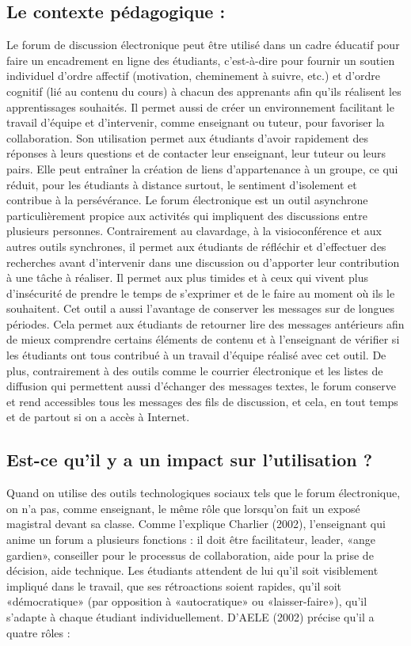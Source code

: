 \documentclass[12pt,a4paper,titlepage]{article}
\begin{document}
\subsection{Le contexte pédagogique :}
Le forum de discussion électronique peut être utilisé dans un cadre éducatif pour faire
un encadrement en ligne des étudiants, c'est-à-dire pour fournir un soutien individuel d'ordre
affectif (motivation, cheminement à suivre, etc.) et d'ordre cognitif (lié au contenu du cours) à
chacun des apprenants afin qu'ils réalisent les apprentissages souhaités. Il permet aussi de créer
un environnement facilitant le travail d'équipe et d'intervenir, comme enseignant ou tuteur, pour
favoriser la collaboration. Son utilisation permet aux étudiants d'avoir rapidement des réponses
à leurs questions et de contacter leur enseignant, leur tuteur ou leurs pairs. Elle peut entraîner
la création de liens d'appartenance à un groupe, ce qui réduit, pour les étudiants à distance
surtout, le sentiment d'isolement et contribue à la persévérance.\newline
Le forum électronique est un outil asynchrone particulièrement propice aux activités qui
impliquent des discussions entre plusieurs personnes. Contrairement au clavardage, à la
visioconférence et aux autres outils synchrones, il permet aux étudiants de réfléchir et
d’effectuer des recherches avant d'intervenir dans une discussion ou d'apporter leur contribution
à une tâche à réaliser. Il permet aux plus timides et à ceux qui vivent plus d'insécurité de prendre
le temps de s'exprimer et de le faire au moment où ils le souhaitent. Cet outil a aussi l'avantage
de conserver les messages sur de longues périodes. Cela permet aux étudiants de retourner lire
des messages antérieurs afin de mieux comprendre certains éléments de contenu et à
l'enseignant de vérifier si les étudiants ont tous contribué à un travail d'équipe réalisé avec cet
outil. De plus, contrairement à des outils comme le courrier électronique et les listes de diffusion
qui permettent aussi d'échanger des messages textes, le forum conserve et rend accessibles tous
les messages des fils de discussion, et cela, en tout temps et de partout si on a accès à Internet.\newline
\subsection{Est-ce qu’il y a un impact sur l’utilisation ?}
Quand on utilise des outils technologiques sociaux tels que le forum électronique, on
n'a pas, comme enseignant, le même rôle que lorsqu'on fait un exposé magistral devant sa
classe. Comme l'explique Charlier (2002), l'enseignant qui anime un forum a plusieurs fonctions : il doit être facilitateur, leader, «ange gardien», conseiller pour le processus de
collaboration, aide pour la prise de décision, aide technique. Les étudiants attendent de lui qu'il
soit visiblement impliqué dans le travail, que ses rétroactions soient rapides, qu'il soit
«démocratique» (par opposition à «autocratique» ou «laisser-faire»), qu'il s'adapte à chaque
étudiant individuellement. D’AELE (2002) précise qu'il a quatre rôles :
 
\end{document}
